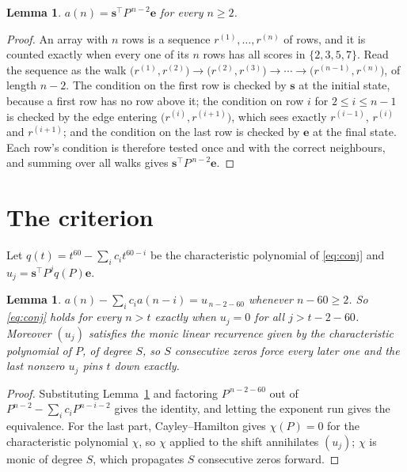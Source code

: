 \documentclass[11pt,a4paper]{article}
\theoremstyle{plain}
\newtheorem{lemma}[theorem]{Lemma}
\theoremstyle{definition}
\begin{document}
\begin{lemma}\label{lem:walk}
$a(n)=\mathbf{s}^{\!\top}P^{\,n-2}\mathbf{e}$ for every $n\ge2$.
\end{lemma}

\begin{proof}
An array with $n$ rows is a sequence $r^{(1)},\dots,r^{(n)}$ of rows, and it is counted
exactly when every one of its $n$ rows has all scores in $\{2,3,5,7\}$. Read the sequence as the
walk $\bigl(r^{(1)},r^{(2)}\bigr)\to\bigl(r^{(2)},r^{(3)}\bigr)\to\cdots\to
\bigl(r^{(n-1)},r^{(n)}\bigr)$, of length $n-2$. The condition on the first row is
checked by $\mathbf{s}$ at the initial state, because a first row has no row above it; the
condition on row $i$ for $2\le i\le n-1$ is checked by the edge entering
$\bigl(r^{(i)},r^{(i+1)}\bigr)$, which sees exactly $r^{(i-1)}$, $r^{(i)}$ and
$r^{(i+1)}$; and the condition on the last row is checked by $\mathbf{e}$ at the final
state. Each row's condition is therefore tested once and with the correct neighbours, and
summing over all walks gives $\mathbf{s}^{\!\top}P^{\,n-2}\mathbf{e}$.
\end{proof}

\section{The criterion}

Let $q(t)=t^{60}-\sum_i c_i t^{60-i}$ be the characteristic polynomial of
\eqref{eq:conj} and $u_j=\mathbf{s}^{\!\top}P^{j}q(P)\mathbf{e}$.

\begin{lemma}\label{lem:crit}
$a(n)-\sum_i c_i a(n-i)=u_{\,n-2-60}$ whenever $n-60\ge2$. So \eqref{eq:conj}
holds for every $n>t$ exactly when $u_j=0$ for all $j>t-2-60$. Moreover $(u_j)$
satisfies the monic linear recurrence given by the characteristic polynomial of $P$, of
degree $S$, so $S$ consecutive zeros force every later one and the last nonzero $u_j$ pins
$t$ down exactly.
\end{lemma}

\begin{proof}
Substituting Lemma~\ref{lem:walk} and factoring $P^{\,n-2-60}$ out of
$P^{n-2}-\sum_i c_i P^{n-i-2}$ gives the identity, and letting the exponent run gives the
equivalence. For the last part, Cayley--Hamilton gives $\chi(P)=0$ for the characteristic
polynomial $\chi$, so $\chi$ applied to the shift annihilates $(u_j)$; $\chi$ is monic of
degree $S$, which propagates $S$ consecutive zeros forward.
\end{proof}
\end{document}

